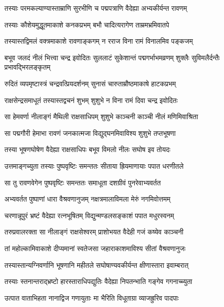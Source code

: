 \twolineshloka
{तस्याः परमकल्याण्यास्ताम्राणि सुरभीणि च}
{पद्मपत्राणि वैदेह्या अभ्यकीर्यन्त रावणम्} %

\twolineshloka
{तस्याः कौशेयमुद्धूतमाकाशे कनकप्रभम्}
{बभौ चादित्यरागेण ताम्रमभ्रमिवातपे} %

\twolineshloka
{तस्यास्तद्विमलं वक्त्रमाकाशे रावणाङ्कगम्}
{न रराज विना रामं विनालमिव पङ्कजम्} %

\threelineshloka
{बभूव जलदं नीलं भित्त्वा चन्द्र इवोदितः}
{सुललाटं सुकेशान्तं पद्मगर्भाभमव्रणम्}
{शुक्लैः सुविमलैर्दन्तैः प्रभावद्भिरलङ्कृतम्} %

\twolineshloka
{रुदितं व्यपमृष्टास्त्रं चन्द्रवत्प्रियदर्शनम्}
{सुनासं चारुताम्रौष्ठमाकाषे हाटकप्रभम्} %

\twolineshloka
{राक्षसेन्द्रसमाधूतं तस्यास्तद्वचनं शुभम्}
{शुशुभे न विना रामं दिवा चन्द्र इवोदितः} %

\twolineshloka
{सा हेमवर्णा नीलाङ्गं मैथिली राक्षसाधिपम्}
{शुशुभे काञ्चनी काञ्ची नीलं मणिमिवाश्रिता} %

\twolineshloka
{सा पद्मगौरी हेमाभा रावणं जनकात्मजा}
{विद्युद्घनमिवाविश्य शुशुभे तप्तभूषणा} %

\twolineshloka
{तस्या भूषणघोषेण वैदेह्या राक्षसाधिपः}
{बभूव विमलो नीलः सघोष इव तोयदः} %

\twolineshloka
{उत्तमाङ्गच्युता तस्याः पुष्पवृष्टिः समन्ततः}
{सीताया ह्रियमाणायाः पपात धरणीतले} %

\twolineshloka
{सा तु रावणवेगेन पुष्पवृष्टिः समन्ततः}
{समाधूता दशग्रीवं पुनरेवाभ्यवर्तत} %

\twolineshloka
{अभ्यवर्तत पुष्पाणां धारा वैश्रवणानुजम्}
{नक्षत्रमालाविमला मेरुं नगमिवोत्तमम्} %

\twolineshloka
{चरणान्नूपुरं भ्रष्टं वैदेह्या रत्नभूषितम्}
{विद्युन्मण्डलसङ्काशं पपात मधुरस्वनम्} %

\twolineshloka
{तरुप्रवालरक्ता सा नीलाङ्गं राक्षसेश्वरम्}
{प्राशोभयत वैदेही गजं कष्येव काञ्चनी} %

\twolineshloka
{तां महोल्कामिवाकाशे दीप्यमानां स्वतेजसा}
{जहाराकाशमाविश्य सीतां वैश्रवणानुजः} %

\twolineshloka
{तस्यास्तान्यग्निवर्णानि भूषणानि महीतले}
{सघोषाण्यवकीर्यन्त क्षीणास्तारा इवाम्बरात्} %

\twolineshloka
{तस्याः स्तनान्तराद्भ्रष्टो हारस्ताराधिपद्युतिः}
{वैदेह्या निपतन्भाति गङ्गेव गगनाच्च्युता} %

\twolineshloka
{उत्पात वाताभिहता नानाद्विज गणायुताः}
{मा भैरिति विधूताग्रा व्याजह्रुरिव पादपाः} %

